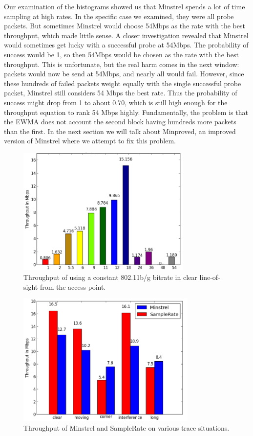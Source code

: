 \documentclass[letterpaper,twocolumn,10pt]{article}
\begin{document}
Our examination of the histograms showed us that Minstrel spends a lot
of time sampling at high rates. In the specific case we examined, they
were all probe packets. But sometimes Minstrel would choose 54Mbps as
the rate with the best throughput, which made little sense. A closer
investigation revealed that Minstrel would sometimes get lucky with a
successful probe at 54Mbps. The probability of success would be 1, so
then 54Mbps would be chosen as the rate with the best throughput. This
is unfortunate, but the real harm comes in the next window: packets
would now be send at 54Mbps, and nearly all would fail.  However,
since these hundreds of failed packets weight equally with the single
successful probe packet, Minstrel still considers 54 Mbps the best
rate. Thus the probability of success might drop from 1 to about 0.70,
which is still high enough for the throughput equation to rank 54 Mbps
highly. Fundamentally, the problem is that the EWMA does not account
the second block having hundreds more packets than the first.  In the
next section we will talk about Minproved, an improved version of
Minstrel where we attempt to fix this problem.

\begin{figure}[htb]
  \hspace{-1em}\includegraphics[width=3.4in]{constant.png}\vspace{-0em}
  \caption{Throughput of using a constant 802.11b/g bitrate in clear line-of-sight from the access point.}
\label{figure:2}
\end{figure}


\begin{figure}[htb]
  \hspace{-.75em}\includegraphics[width=3.5in]{MinVSSam1.png}\vspace{-0.75em}
  \caption{Throughput of Minstrel and SampleRate on various trace situations.}
\label{figure:3}
\end{figure}
\end{document}
